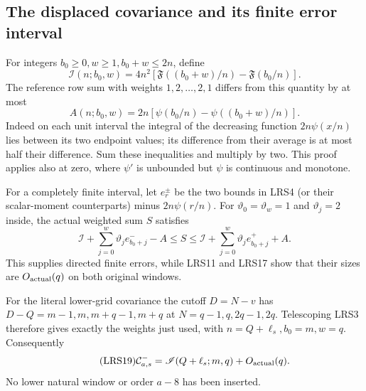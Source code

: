 \subsection{The displaced covariance and its finite error interval}

For integers $b_0\ge0,w\ge1,b_0+w\le2n$, define
\[
 \mathscr I(n;b_0,w)=4n^2\left[
 \mathfrak F((b_0+w)/n)-\mathfrak F(b_0/n)\right].
\]
The reference row sum with weights $1,2,\ldots,2,1$ differs from this
quantity by at most
\begin{equation}\tag{LRS17}
 A(n;b_0,w)=2n[\psi(b_0/n)-\psi((b_0+w)/n)].
\end{equation}
Indeed on each unit interval the integral of the decreasing function
$2n\psi(x/n)$ lies between its two endpoint values; its difference
from their average is at most half their difference.  Sum these
inequalities and multiply by two.  This proof applies also at zero,
where $\psi'$ is unbounded but $\psi$ is continuous and monotone.

For a completely finite interval, let $e_r^\pm$ be the two bounds in
LRS4 (or their scalar-moment counterparts) minus $2n\psi(r/n)$.
For $\vartheta_0=\vartheta_w=1$ and $\vartheta_j=2$ inside, the
actual weighted sum $S$ satisfies
\begin{equation}\tag{LRS18}
 \mathscr I+\sum_{j=0}^w\vartheta_je_{b_0+j}^--A
 \le S\le
 \mathscr I+\sum_{j=0}^w\vartheta_je_{b_0+j}^++A.
\end{equation}
This supplies directed finite errors, while LRS11 and LRS17 show
that their sizes are $O_{\rm actual}(q)$ on both original windows.

For the literal lower-grid covariance the cutoff $D=N-v$ has
$D-Q=m-1,m,m+q-1,m+q$ at $N=q-1,q,2q-1,2q$.
Telescoping LRS3 therefore gives exactly the weights just used, with
$n=Q+\ell_s,b_0=m,w=q$.  Consequently
\begin{equation}\tag{LRS19}
 \mathcal C^-_{a,s}=\mathscr I(Q+\ell_s;m,q)+O_{\rm actual}(q).
\end{equation}
No lower natural window or order $a-8$ has been inserted.

